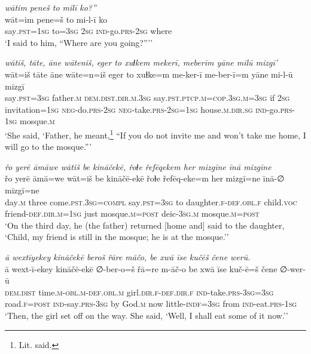 \ea \label{ŽH.31}
\textit{wātim peneš to milī ko?”} \\ 
\gll wāt=im pene=š to mi-l-ī ko \\ 
 say\textsc{.pst}\textsc{=1sg} to\textsc{=3sg} \textsc{2sg} \textsc{ind-}go\textsc{.prs}-\textsc{2sg} where \\ 
\glt `I said to him, “Where are you going?”’'
\z 
 
\ea \label{ŽH.33}
\textit{wātiš, tāte, āne wāteniš, eger to xuɫkem mekerī, meberīm yāne milū mizgī’} \\ 
\gll wāt=iš tāte āne wāte=n=iš eger to xuɫke=m me-ker-ī me-ber-ī=m yāne mi-l-ū mizgī \\ 
 say\textsc{.pst}\textsc{=3sg} father\textsc{.m} \textsc{dem.dist}\textsc{.dir}\textsc{.m}\textsc{.3sg} say\textsc{.pst}\textsc{.ptcp}\textsc{.m}\textsc{=cop}\textsc{.3sg}\textsc{.m}\textsc{=3sg} if \textsc{2sg} invitation\textsc{=1sg} \textsc{neg-}do\textsc{.prs}-\textsc{2sg} \textsc{neg-}take\textsc{.prs}-\textsc{2sg}\textsc{=1sg} house\textsc{.m}\textsc{.dir.sg} \textsc{ind-}go\textsc{.prs}\textsc{-1sg} mosque\textsc{.m} \\ 
\glt `She said, ‘Father, he meant,\footnote{Lit. said.} “If you do not invite me and won’t take me home, I will go to the mosque.”'
\z 
 
\ea \label{ŽH.37}
\textit{řo yerē āmāwe wātiš be kināčekē, řoɫe řefēqekem her mizgīne īnā mizgīne} \\ 
\gll řo yerē āmā=we wāt=iš be kināčē-ekē řoɫe řefēq-eke=m her mizgī=ne īnā-∅ mizgī=ne \\ 
 day\textsc{.m} three come\textsc{.pst}\textsc{.3sg}\textsc{=compl} say\textsc{.pst}\textsc{=3sg} to daughter\textsc{\textsc{.f}}\textsc{-def}\textsc{.obl}\textsc{\textsc{.f}} child.\textsc{voc} friend\textsc{-def}\textsc{.dir}\textsc{.m}\textsc{=1sg} just mosque\textsc{.m}\textsc{=\textsc{post}} deic\textsc{-3sg}\textsc{.m} mosque\textsc{.m}\textsc{=\textsc{post}} \\ 
\glt `On the third day, he (the father) returned [home and] said to the daughter, ‘Child, my friend is still in the mosque; he is at the mosque.’'
\z 
 
\ea \label{ŽH.41}
\textit{ā wextīyekey kināčekē beroš řāre māčo, be xwā īse kučēš čene werū.} \\ 
\gll ā wext-ī-ekey kināčē-ekē ∅-ber-o=š řā=re m-āč-o be xwā īse kuč-ē=š čene ∅-wer-ū \\ 
 \textsc{dem.dist} time\textsc{.m}\textsc{-obl}\textsc{.m}\textsc{-def}\textsc{.obl}\textsc{.m} girl\textsc{.dir}\textsc{\textsc{.f}}\textsc{-def}\textsc{.dir}\textsc{\textsc{.f}} \textsc{ind-}take\textsc{.prs}\textsc{-3sg}\textsc{=3sg} road\textsc{\textsc{.f}}\textsc{=\textsc{post}} \textsc{ind-}say\textsc{.prs}\textsc{-3sg} by God\textsc{.m} now little\textsc{-indf}\textsc{=3sg} from \textsc{ind-}eat\textsc{.prs}\textsc{-1sg} \\ 
\glt `Then, the girl set off on the way. She said, ‘Well, I shall eat some of it now.’'
\z 
 
